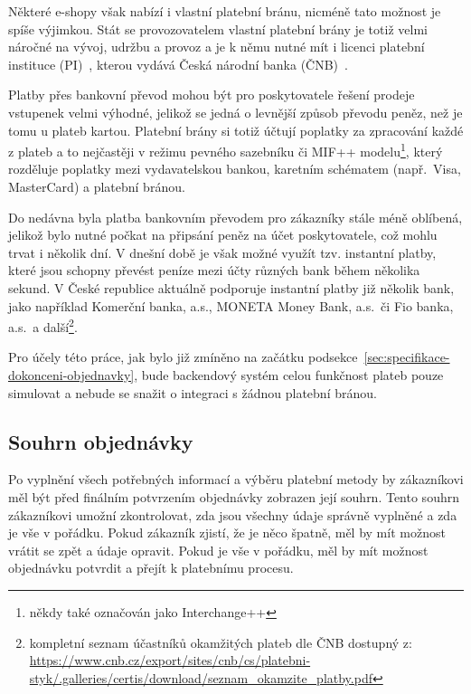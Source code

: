 Některé e-shopy však nabízí i vlastní platební bránu, nicméně tato možnost je spíše výjimkou.
Stát se provozovatelem vlastní platební brány je totiž velmi náročné na vývoj, udržbu a provoz a je k němu nutné mít i licenci platební instituce (PI)~\cite{schejbal_platebni_instituce}, kterou vydává Česká národní banka (ČNB)~\cite{cnb_dohled_platebni_instituce}.

Platby přes bankovní převod mohou být pro poskytovatele řešení prodeje vstupenek velmi výhodné, jelikož se jedná o levnější způsob převodu peněz, než je tomu u plateb kartou.
Platební brány si totiž účtují poplatky za zpracování každé z plateb a to nejčastěji v režimu pevného sazebníku či MIF++ modelu\footnote{někdy také označován jako Interchange++}, který rozděluje poplatky mezi vydavatelskou bankou, karetním schématem (např.\ Visa, MasterCard) a platební bránou.

Do nedávna byla platba bankovním převodem pro zákazníky stále méně oblíbená, jelikož bylo nutné počkat na připsání peněz na účet poskytovatele, což mohlu trvat i několik dní.
V dnešní době je však možné využít tzv.
instantní platby, které jsou schopny převést peníze mezi účty různých bank během několika sekund.
V České republice aktuálně podporuje instantní platby již několik bank, jako například Komerční banka, a.s., MONETA Money Bank, a.s.\ či Fio banka, a.s.\ a další\footnote{kompletní seznam účastníků okamžitých plateb dle ČNB dostupný z: \url{https://www.cnb.cz/export/sites/cnb/cs/platebni-styk/.galleries/certis/download/seznam_okamzite_platby.pdf}}.

Pro účely této práce, jak bylo již zmíněno na začátku podsekce~\ref{sec:specifikace-dokonceni-objednavky}, bude backendový systém celou funkčnost plateb pouze simulovat a nebude se snažit o integraci s žádnou platební bránou.


\subsection{Souhrn objednávky}
\label{subsec:specifikace-dokonceni-objednavky-souhrn-objednavky}
Po vyplnění všech potřebných informací a výběru platební metody by zákazníkovi měl být před finálním potvrzením objednávky zobrazen její souhrn.
Tento souhrn zákazníkovi umožní zkontrolovat, zda jsou všechny údaje správně vyplněné a zda je vše v pořádku.
Pokud zákazník zjistí, že je něco špatně, měl by mít možnost vrátit se zpět a údaje opravit.
Pokud je vše v pořádku, měl by mít možnost objednávku potvrdit a přejít k platebnímu procesu.

